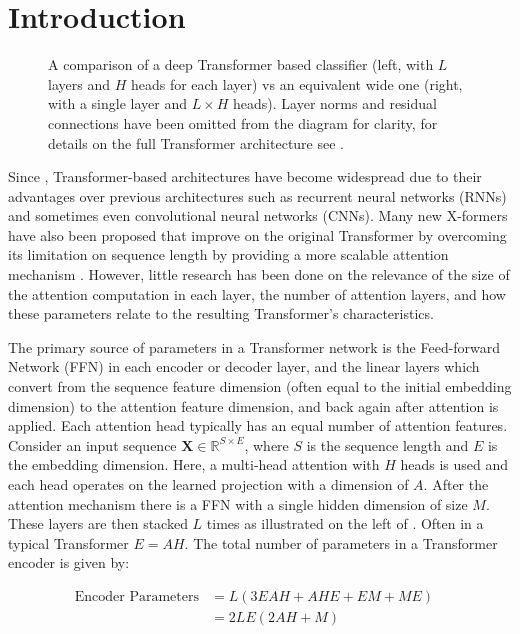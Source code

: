 \section{Introduction}

\begin{figure}[hbt]
    \centering
    \tiny
    
    \caption{A comparison of a deep Transformer based classifier (left, with $L$ layers and $H$ heads for each layer) vs an equivalent wide one (right, with a single layer and $L \times H$ heads). Layer norms and residual connections have been omitted from the diagram for clarity, for details on the full Transformer architecture see \cite{tfm}.}
    \label{fig:wide}
\end{figure}

Since \citet{tfm}, Transformer-based architectures have become widespread due to their advantages over previous architectures such as recurrent neural networks (RNNs) and sometimes even convolutional neural networks (CNNs).
Many new X-formers have also been proposed that improve on the original Transformer by overcoming its limitation on sequence length by providing a more scalable attention mechanism \citep{performer, linformer, longformer}.
However, little research has been done on the relevance of the size of the attention computation in each layer, the number of attention layers, and how these parameters relate to the resulting Transformer's characteristics.

The primary source of parameters in a Transformer network is the Feed-forward Network (FFN) in each encoder or decoder layer, and the linear layers which convert from the sequence feature dimension (often equal to the initial embedding dimension) to the attention feature dimension, and back again after attention is applied.
Each attention head typically has an equal number of attention features.
Consider an input sequence $\bm{X} \in \mathbb{R}^{S \times E}$, where $S$ is the sequence length and $E$ is the embedding dimension.
Here, a multi-head attention with $H$ heads is used and each head operates on the learned projection with a dimension of $A$. After the attention mechanism there is a FFN with a single hidden dimension of size $M$. These layers are then stacked $L$ times as illustrated on the left of .
Often in a typical Transformer $E=AH$. The total number of parameters in a Transformer encoder is given by:

\begin{align*}
    \text{Encoder Parameters} & = L(3EAH + AHE + EM + ME) & \\
                              & = 2LE(2AH + M)
\end{align*}

